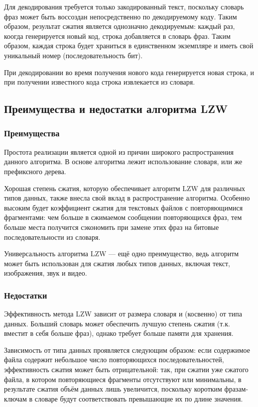 Для декодирования требуется только закодированный текст, поскольку словарь фраз может быть воссоздан непосредственно по декодируемому коду. Таким образом, результат сжатия является однозначно декодируемым: каждый раз, коогда генерируется новый код, строка добавляется в словарь фраз. Таким образом, каждая строка будет храниться в единственном экземпляре и иметь свой уникальный номер (последовательность бит).

При декодировании во время получения нового кода генерируется новая строка, и при получении известного кода строка извлекается из словаря.


\subsection{Преимущества и недостатки алгоритма LZW}

\subsubsection{Преимущества}

Простота реализации является одной из причин широкого распространения данного алгоритма. В основе алгоритма лежит использование словаря, или же префиксного дерева.

Хорошая степень сжатия, которую обеспечивает алгоритм LZW для различных типов данных, также внесла свой вклад в распространение алгоритма. Особенно высоким будет коэффициент сжатия для текстовых файлов с повторяющимися фрагментами: чем больше в сжимаемом сообщении повторяющихся фраз, тем больше места получится сэкономить при замене этих фраз на битовые последовательности из словаря.

Универсальность алгоритма LZW --- ещё одно преимущество, ведь алгоритм может быть использован для сжатия любых типов данных, включая текст, изображения, звук и видео. 

\subsubsection{Недостатки}

Эффективность метода LZW зависит от размера словаря и (косвенно) от типа данных. Больший словарь может обеспечить лучшую степень сжатия (т.к. вместит в себя больше фраз), однако требует больше памяти для хранения.

Зависимость от типа данных проявляется следующим образом: если содержимое файла содержит небольшое число повторяющихся последовательностей, эффективность сжатия может быть отрицательной: так, при сжатии уже сжатого файла, в котором повторяющиеся фрагменты отсутствуют или минимальны, в результате сжатия объём данных лишь увеличится, поскольку коротким фразам-ключам в словаре будут соответствовать превышающие их по длине значения.

